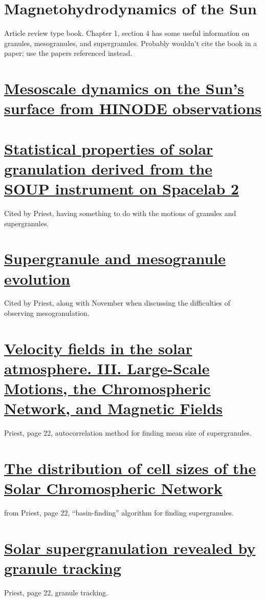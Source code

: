 \documentclass{article}
\begin{document}
\section{%
Magnetohydrodynamics of the Sun}
Article review type book. Chapter 1, section 4 has some useful
information on granules, mesogranules, and supergranules.
Probably wouldn't cite the book in a paper; use the papers referenced
instead.

\section{%
\href{http://adsabs.harvard.edu/cgi-bin/bib_query?arXiv:0902.2299}
{Mesoscale dynamics on the Sun's surface from HINODE
observations}}

\section{%
\href{http://cdsads.u-strasbg.fr/abs/1989ApJ...336..475T}
{Statistical properties of solar granulation derived
from the SOUP instrument on Spacelab 2}}
Cited by Priest, having something to do with
the motions of granules and supergranules.

\section{%
\href{http://cdsads.u-strasbg.fr/abs/2000SoPh..193..313S}
{Supergranule and mesogranule evolution}}
Cited by Priest, along with November when
discussing the difficulties of observing mesogranulation.

\section{%
\href{http://cdsads.u-strasbg.fr/abs/1964ApJ...140.1120S}
{Velocity fields in the solar atmosphere. III.
Large-Scale Motions, the Chromospheric Network, and Magnetic Fields}}
Priest, page 22, autocorrelation method for finding mean size of
supergranules.

\section{%
\href{http://cdsads.u-strasbg.fr/abs/1997ApJ...481..988H}
{The distribution of cell sizes of the Solar Chromospheric Network}}
from Priest, page 22, ``basin-finding'' algorithm for finding
supergranules.

\section{%
\href{http://cdsads.u-strasbg.fr/abs/2008A\%26A...479L..17R}
{Solar supergranulation revealed by granule tracking}}
Priest, page 22, granule tracking.
\end{document}
